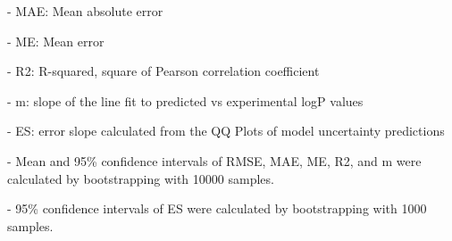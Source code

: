\documentclass{article}
\begin{document}
- MAE: Mean absolute error

- ME: Mean error

- R2: R-squared, square of Pearson correlation coefficient

- m: slope of the line fit to predicted vs experimental logP values

- ES: error slope calculated from the QQ Plots of model uncertainty predictions

- Mean and 95\% confidence intervals of RMSE, MAE, ME, R2, and m were calculated by bootstrapping with 10000 samples.

- 95\% confidence intervals of ES were calculated by bootstrapping with 1000 samples.\end{document}
\end{document}
